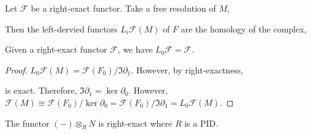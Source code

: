 \documentclass[12pt]{extarticle}
\begin{document}
\begin{definition}
Let $\mathcal{F}$ be a right-exact functor. Take a free resolution of $M$,
\begin{center}
\end{center}
Then the left-dervied functors $L_i\mathcal{F}(M)$ of $F$ are the homology of the complex,
\begin{center}
\end{center}
\end{definition}

\begin{lemma}
Given a right-exact functor $\mathcal{F}$, we have $L_0 \mathcal{F} = \mathcal{F}$.
\end{lemma}

\begin{proof}
$L_0 \mathcal{F}(M) = \mathcal{F}(F_0) / \Im{\partial_1}$. However, 
by right-exactness,
\begin{center}
\end{center}
is exact. Therefore, $\Im{\partial_1} = \ker{\partial_0}$. However, $\mathcal{F}(M) \cong \mathcal{F}(F_0)/ \ker{\partial_0} = \mathcal{F}(F_0)/\Im{\partial_1} = L_0 \mathcal{F}(M)$. 
\end{proof}

\begin{lemma}
The functor $(-) \otimes_R N$ is right-exact where $R$ is a PID.
\end{lemma}
\end{document}
